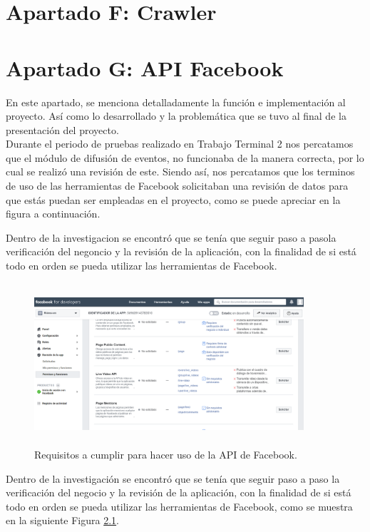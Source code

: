	\chapter{Apartado F: Crawler}
		\label{crawler}
	

	\chapter{Apartado G: API Facebook}
	\label{apiFB}
	\noindent En este apartado, se menciona detalladamente la función e implementación al proyecto. Así como lo desarrollado y la problemática que se tuvo al final de la presentación del proyecto.\\
		
	Durante el periodo de pruebas realizado en Trabajo Terminal 2 nos percatamos que el módulo de difusión de eventos, no funcionaba de la manera correcta, por lo cual se realizó una revisión de este. Siendo así, nos percatamos que los terminos de uso de las herramientas de Facebook solicitaban una revisión de datos para que estás puedan ser empleadas en el proyecto, como se puede apreciar en la figura a continuación.
	
	Dentro de la investigacion se encontró que se  tenía que seguir paso a pasola verificación del negoncio y la revisión de la aplicación, con la finalidad de si está todo en orden se pueda utilizar las herramientas de Facebook.
	
	\begin{figure}[hbt!]
		\centering
		\includegraphics[width=10cm, height=6cm]{Imagenes/FacebookAPI/RequisitoPagina}
		\caption{Requisitos a cumplir para hacer uso de la API de Facebook.}
		\label{requisitosfb}
	\end{figure}
	
	\noindent Dentro de la investigación se encontró que se tenía que seguir paso a paso la
	verificación del negocio y la revisión de la aplicación, con la finalidad de si está todo en orden se
	pueda utilizar las herramientas de Facebook, como se muestra en la siguiente Figura \ref{requisitosfb}. \\
	
